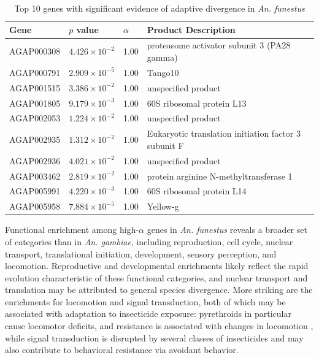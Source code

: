 \begin{table}[htp]
\centering
\begin{tabular}{@{}llll@{}}
\toprule
\textbf{Gene} & \textbf{$p$ value}   & \textbf{$\alpha$} & \textbf{Product Description}                         \\ \midrule
AGAP000308    & $4.426\times10^{-2}$   & 1.00                 & proteasome activator subunit 3 (PA28 gamma)          \\
AGAP000791    & $2.909\times10^{-5}$ & 1.00                 & Tango10                                              \\
AGAP001515    & $3.386\times10^{-2}$   & 1.00                 & unspecified product                                  \\
AGAP001805    & $9.179\times10^{-3}$  & 1.00                 & 60S ribosomal protein L13                            \\
AGAP002053    & $1.224\times10^{-2}$   & 1.00                 & unspecified product                                  \\
AGAP002935    & $1.312\times10^{-2}$   & 1.00                 & Eukaryotic translation initiation factor 3 subunit F \\
AGAP002936    & $4.021\times10^{-2}$   & 1.00                 & unspecified product                                  \\
AGAP003462    & $2.819\times10^{-2}$   & 1.00                 & protein arginine N-methyltransferase 1               \\
AGAP005991    & $4.220\times10^{-3}$  & 1.00                 & 60S ribosomal protein L14                            \\
AGAP005958    & $7.884\times10^{-5}$ & 1.00                 & Yellow-g                                             \\ \bottomrule
\end{tabular}
\caption{Top 10 genes with significant evidence of adaptive divergence in \textit{An. funestus}}
\label{table:afunMK}
\end{table}

Functional enrichment among high-$\alpha$ genes in \textit{An. funestus}
reveals a broader set of categories than in \textit{An. gambiae},
including reproduction, cell cycle, nuclear transport,
translational initiation, development, sensory perception, and locomotion.
Reproductive and developmental enrichments
likely reflect the rapid evolution characteristic of these functional categories,
and nuclear transport and translation may be attributed to general species divergence.
More striking are the enrichments for locomotion and signal transduction,
both of which may be associated with adaptation to insecticide exposure:
pyrethroids in particular cause locomotor deficits,
and resistance is associated with changes in locomotion
\citep{pyretheroid-loc, pyretheroid-fit},
while signal transduction is disrupted by several classes of insecticides
\citep{signal_transduction_insecticides}
and may also contribute to behavioral resistance via avoidant behavior.


